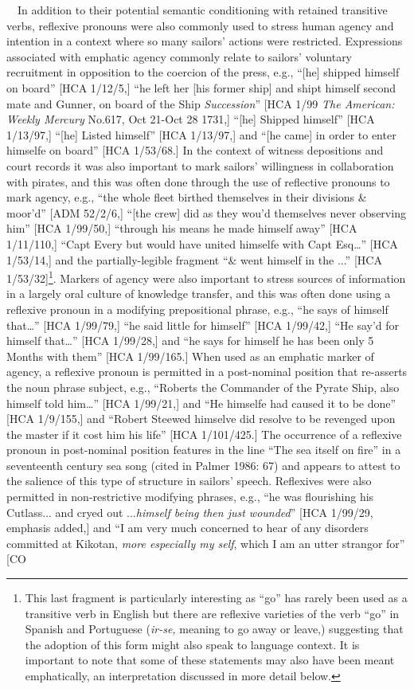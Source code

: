 \begin{styleStandard}
\ \ In addition to their potential semantic conditioning with retained transitive verbs, reflexive pronouns were also commonly used to stress human agency and intention in a context where so many sailors’ actions were restricted. Expressions associated with emphatic agency commonly relate to sailors’ voluntary recruitment in opposition to the coercion of the press, e.g., “[he] shipped himself on board” [HCA 1/12/5,] “he left her [his former ship] and shipt himself second mate and Gunner, on board of the Ship \textit{Succession}” [HCA 1/99 \textit{The American: Weekly Mercury} No.617, Oct 21-Oct 28 1731,] “[he] Shipped himself” [HCA 1/13/97,] “[he] Listed himself” [HCA 1/13/97,] and “[he came] in order to enter himselfe on board” [HCA 1/53/68.] In the context of witness depositions and court records it was also important to mark sailors’ willingness in collaboration with pirates, and this was often done through the use of reflective pronouns to mark agency, e.g., “the whole fleet birthed themselves in their divisions \& moor’d” [ADM 52/2/6,] “[the crew] did as they wou’d themselves never observing him” [HCA 1/99/50,] “through his means he made himself away” [HCA 1/11/110,] “Capt Every but would have united himselfe with Capt Esq…” [HCA 1/53/14,] and the partially-legible fragment “\& went himself in the ...” [HCA 1/53/32]\footnote{ This last fragment is particularly interesting as “go” has rarely been used as a transitive verb in English but there are reflexive varieties of the verb “go” in Spanish and Portuguese (\textit{ir-se,} meaning to go away or leave,) suggesting that the adoption of this form might also speak to language context. It is important to note that some of these statements may also have been meant emphatically, an interpretation discussed in more detail below. }. Markers of agency were also important to stress sources of information in a largely oral culture of knowledge transfer, and this was often done using a reflexive pronoun in a modifying prepositional phrase, e.g., “he says of himself that…” [HCA 1/99/79,] “he said little for himself” [HCA 1/99/42,] “He say’d for himself that…” [HCA 1/99/28,] and “he says for himself he has been only 5 Months with them” [HCA 1/99/165.] When used as an emphatic marker of agency, a reflexive pronoun is permitted in a post-nominal position that re-asserts the noun phrase subject, e.g., “Roberts the Commander of the Pyrate Ship, also himself told him…” [HCA 1/99/21,] and “He himselfe had caused it to be done” [HCA 1/9/155,] and “Robert Steewed himselve did resolve to be revenged upon the master if it cost him his life” [HCA 1/101/425.] The occurrence of a reflexive pronoun in post-nominal position features in the line “The sea itself on fire” in a seventeenth century sea song (cited in Palmer 1986: 67) and appears to attest to the salience of this type of structure in sailors’ speech. Reflexives were also permitted in non-restrictive modifying phrases, e.g., “he was flourishing his Cutlass... and cryed out ...\textit{himself being then just wounded}” [HCA 1/99/29, emphasis added,] and “I am very much concerned to hear of any disorders committed at Kikotan, \textit{more especially my self}, which I am an utter strangor for” [CO 
\end{styleStandard}
